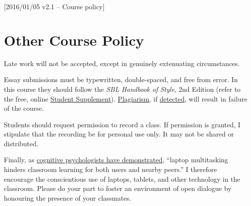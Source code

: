 [2016/01/05 v2.1 -- Course policy]

\section{Other Course Policy}
\label{policy}

Late work will not be accepted, except in genuinely extenuating
circumstances.

Essay submissions must be typewritten, double-spaced, and free from
error. In this course they should follow the \emph{SBL Handbook of Style},
2nd Edition (refer to the free, online \href{https://www.sbl-site.org/assets/pdfs/pubs/SBLHSsupp2015-02.pdf}{Student Supplement}).
\href{http://www.eerdmans.com/Pages/Item/59043/Commentary-Statement.aspx}{Plagiarism},
if \href{https://www.theguardian.com/world/2013/feb/09/german-education-minister-quits-phd-plagiarism}{detected},
will result in failure of the course.

Students should request permission to record a class. If permission is
granted, I stipulate that the recording be for personal use only. It may
not be shared or distributed.

Finally, as \href{http://dx.doi.org/10.1016/j.compedu.2012.10.003}{cognitive
psychologists have demonstrated}, ``laptop multitasking hinders
classroom learning for both users and nearby peers.'' I therefore
encourage the conscientious use of laptops, tablets, and other
technology in the classroom. Please do your part to foster an
environment of open dialogue by honouring the presence of your
classmates.